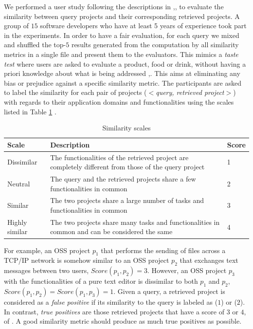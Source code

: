 We performed a user study following the descriptions in \cite{Lo:2012:DSA:2473496.2473616},\cite{McMillan:2012:DSS:2337223.2337267},\cite{10.1109/SANER.2017.7884605} to evaluate the similarity between query projects and their corresponding retrieved projects. A group of $15$ software developers who have at least 5 years of experience took part in the experiments. In order to have a fair evaluation, for each query we mixed and shuffled the top-$5$ results generated from the computation by all similarity metrics in a single file and present them to the evaluators. This mimics a \emph{taste test} where users are asked to evaluate a product, \eg food or drink, without having a priori knowledge about what is being addressed \cite{Ghose2001},\cite{doi:10.1108/13522750810879048}. This aims at eliminating any bias or prejudice against a specific similarity metric. The participants are asked to label the similarity for each pair of projects (\ie $<$\textit{query, retrieved project}$>$) with regards to their application domains and functionalities using the scales listed in Table \ref{tab:Scales} \cite{McMillan:2012:DSS:2337223.2337267}.

\begin{table}[h!]
	\centering
	\begin{tabular}{|p{3.0cm}|p{8.0cm}|p{1.0cm}|}  \hline
		{\bf Scale} & {\bf Description} & {\bf Score} \\  \hline
		Dissimilar & The functionalities of the retrieved project are completely different from those of the query project & 1 \\ \hline
		Neutral & The query and the retrieved projects share a few functionalities in common & 2 \\ \hline
		Similar & The two projects share a large number of tasks and functionalities in common & 3 \\ \hline
		Highly similar & The two projects share many tasks and functionalities in common and can be considered the same & 4 \\ \hline
	\end{tabular}
	\caption[The similarity scales]{Similarity scales}
	\label{tab:Scales}
\end{table}

For example, an OSS project $p_{1}$ that performs the sending of files across a TCP/IP network is somehow similar to an OSS project $p_{2}$ that exchanges text messages between two users, \ie $Score(p_{1},p_{2})=3$. However, an OSS project $p_{3}$ with the functionalities of a pure text editor is dissimilar to both $p_{1}$ and $p_{2}$, \ie $Score(p_{1},p_{2})=Score(p_{1},p_{3})=1$. Given a query, a retrieved project is considered as a \emph{false positive} if its similarity to the query is labeled as  ($1$) or  ($2$). In contrast, \emph{true positives} are those retrieved projects that have a score of $3$ or $4$, \ie {} of . A good similarity metric should produce as much true positives as possible.


